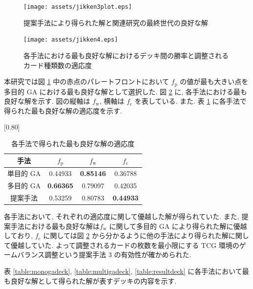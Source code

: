 \documentclass[12pt]{jarticle}
\begin{document}
\begin{figure}[t]
  \centering
  \texttt{[image: assets/jikken3plot.eps]}
  \vspace{-0.3cm}
  \caption{提案手法により得られた解と関連研究の最終世代の良好な解}
  \label{fig:jikken3plot}
\end{figure}
\begin{figure}[t]
  \centering
  \texttt{[image: assets/jikken4.eps]}
  \vspace{-0.3cm}
  \caption{各手法における最も良好な解におけるデッキ間の勝率と調整されるカード種類数の適応度}
  \label{fig:jikken3cardandwin}
\end{figure}
本研究では図 \ref{fig:jikken3plot} 中の赤点のパレートフロントにおいて $f_\mathrm{p}$ の値が最も大きい点を多目的 GA における最も良好な解として選択した.
図 \ref{fig:jikken3cardandwin} に, 各手法における最も良好な解を示す. 図の縦軸は $f_\mathrm{w}$, 横軸は $f_\mathrm{c}$ を表している. 
また. 表 \ref{res_3} に各手法で得られた最も良好な解の適応度を示す.
\begin{table}[t]
  \centering
  \caption{各手法で得られた最も良好な解の適応度}
  \label{res_3}
  \vspace{-0.3cm}
  
  \scalebox{0.80}[0.80]{
    \begin{tabular}{|c|c|c|c|}
      \hline
      手法        & $f_\mathrm{p}$ & $f_\mathrm{w}$ & $f_\mathrm{c}$ \\ \hline \hline
      単目的 GA      & 0.44933         & \textbf{0.85146}   & 0.36788          \\ \hline
      多目的 GA  & \textbf{0.66365}         & 0.79097   & 0.42035          \\ \hline
      提案手法   & 0.53259              &  0.80783     & \textbf{0.44933}  \\ \hline
      \end{tabular}
  }
  \vspace{-0.3cm}
  \end{table}
\par
各手法において, それぞれの適応度に関して優越した解が得られていた. また, 提案手法における最も良好な解は$f_\mathrm{w}$ に関して多目的 GA により得られた解に優越しており, $f_\mathrm{c}$ に関しては図 \ref{fig:jikken3cardandwin} から分かるように他の手法により得られた解に関して優越していた. よって調整されるカードの枚数を最小限にする TCG 環境のゲームバランス調整という提案手法 3 の有効性が確かめられた.
\par
表 \ref{table:monogadeck}, \ref{table:multigadeck}, \ref{table:resultdeck} に各手法において最も良好な解として得られた解が表すデッキの内容を示す.
\end{document}
